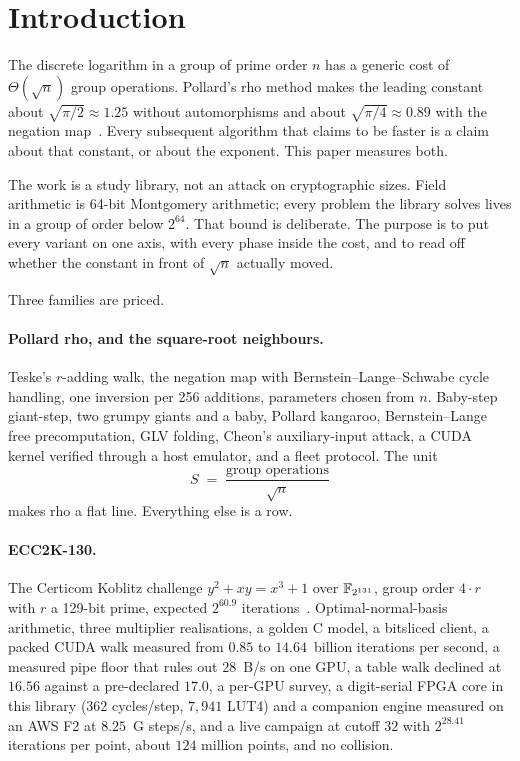 \section{Introduction}
\label{sec:intro}

The discrete logarithm in a group of prime order $n$ has a generic
cost of $\Theta(\sqrt{n})$ group operations. Pollard's rho method
makes the leading constant about $\sqrt{\pi/2}\approx 1.25$ without
automorphisms and about $\sqrt{\pi/4}\approx 0.89$ with the negation
map~\cite{pollard1978,teske2001,bls2011}. Every subsequent algorithm
that claims to be faster is a claim about that constant, or about the
exponent. This paper measures both.

The work is a study library, not an attack on cryptographic sizes.
Field arithmetic is 64-bit Montgomery arithmetic; every problem the
library solves lives in a group of order below $2^{64}$. That bound is
deliberate. The purpose is to put every variant on one axis, with
every phase inside the cost, and to read off whether the constant in
front of $\sqrt{n}$ actually moved.

Three families are priced.

\paragraph{Pollard rho, and the square-root neighbours.}
Teske's $r$-adding walk, the negation map with Bernstein--Lange--Schwabe
cycle handling, one inversion per 256 additions, parameters chosen from
$n$. Baby-step giant-step, two grumpy giants and a baby, Pollard
kangaroo, Bernstein--Lange free precomputation, GLV folding, Cheon's
auxiliary-input attack, a CUDA kernel verified through a host emulator,
and a fleet protocol. The unit
\[
  S \;=\; \frac{\text{group operations}}{\sqrt{n}}
\]
makes rho a flat line. Everything else is a row.

\paragraph{ECC2K-130.}
The Certicom Koblitz challenge $y^2+xy=x^3+1$ over $\mathbb{F}_{2^{131}}$,
group order $4\cdot r$ with $r$ a 129-bit prime, expected
$2^{60.9}$ iterations~\cite{bailey2009,certicom1997}. Optimal-normal-basis
arithmetic, three multiplier realisations, a golden C model, a bitsliced
client, a packed CUDA walk measured from $0.85$ to $14.64$~billion
iterations per second, a measured pipe floor that rules out $28$~B/s on
one GPU, a table walk declined at $16.56$ against a pre-declared $17.0$,
a per-GPU survey, a digit-serial FPGA core in this library ($362$
cycles/step, $7{,}941$ LUT4) and a companion engine measured on an AWS
F2 at $8.25$~G steps/s, and a live campaign at cutoff $32$ with
$2^{28.41}$ iterations per point, about $124$ million points, and no
collision.


